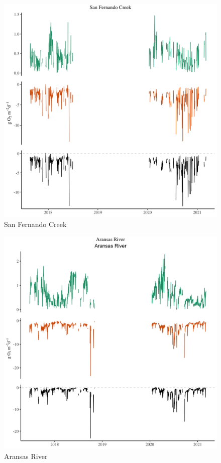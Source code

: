 \begin{figure}[htb]
\begin{center}
\includegraphics[scale=0.2]{Figs/SFC.png}
\caption{San Fernando Creek}
\label{Fig:SFC}
\end{center}
\end{figure}

\begin{figure}[htb]
\begin{center}
\includegraphics[scale=0.2]{Figs/AR.png}
\caption{Aransas River}
\label{Fig:AR}
\end{center}
\end{figure}

